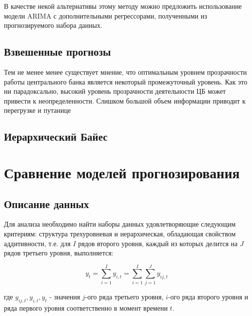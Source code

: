 \documentclass[12pt,a4paper, oneside]{extreport}
\begin{document}
В качестве некой альтернативы этому методу можно предложить использование модели ARIMA с дополнительными регрессорами, полученными из прогнозируемого набора данных. 




\section{Взвешенные прогнозы}

Тем не менее менее существует мнение, что оптимальным уровнем прозрачности работы центрального банка является некоторый промежуточный уровень. Как это ни парадоксально, высокий уровень прозрачности деятельности ЦБ может привести к неопределенности.  Слишком большой объем информации приводит к перегрузке и путанице%


\section{Иерархический Байес}




\chapter{Сравнение моделей прогнозирования}





\section{Описание данных}

Для анализа  необходимо найти наборы данных удовлетворяющие следующим критериям: 
структура трехуровневая и иерархическая, обладающая свойством аддитивности, т.е. для $I$ рядов второго уровня, каждый из которых делится на $J$ рядов третьего уровня, выполняется: 

\begin{equation}\label{key}
y_t = \sum_{i=1}^I y_{i,t} = \sum_{i=1}^I \sum_{j=1}^J y_{ij,t} 
\end{equation}

где $y_{ij,t}, y_{i,t},  y_{t}  $ - значения $j$-ого ряда третьего уровня, $i$-ого ряда второго уровня и ряда первого уровня соответственно в момент времени $t$. 
\end{document}

